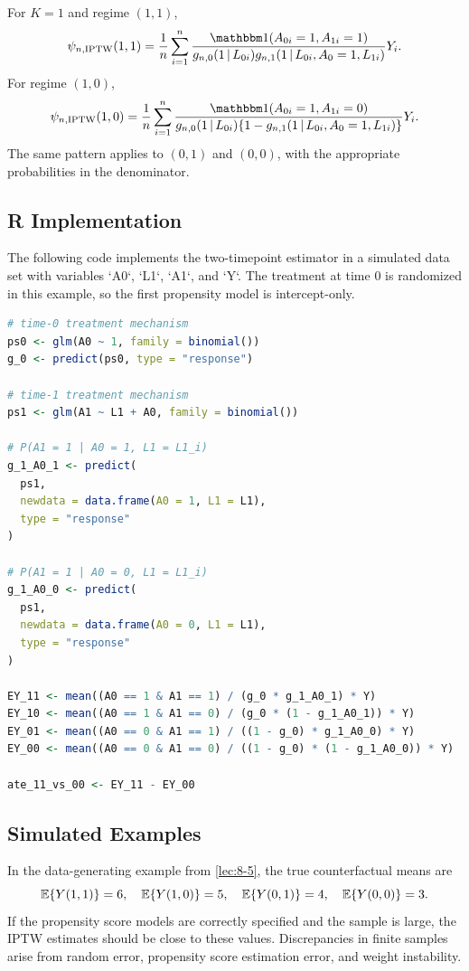 For $K=1$ and regime $(1,1)$,
\[
  \psi_{n,\IPTW}(1,1)
  =
  \frac{1}{n}\sum_{i=1}^n
  \frac{\ind(A_{0i}=1,A_{1i}=1)}
       {g_{n,0}(1\given L_{0i})
        g_{n,1}(1\given L_{0i},A_0=1,L_{1i})}
  Y_i.
\]
For regime $(1,0)$,
\[
  \psi_{n,\IPTW}(1,0)
  =
  \frac{1}{n}\sum_{i=1}^n
  \frac{\ind(A_{0i}=1,A_{1i}=0)}
       {g_{n,0}(1\given L_{0i})
        \{1-g_{n,1}(1\given L_{0i},A_0=1,L_{1i})\}}
  Y_i.
\]
The same pattern applies to $(0,1)$ and $(0,0)$, with the appropriate
probabilities in the denominator.

\subsection{R Implementation}

The following code implements the two-timepoint estimator in a simulated data
set with variables `A0`, `L1`, `A1`, and `Y`. The treatment at time 0 is
randomized in this example, so the first propensity model is intercept-only.

\begin{lstlisting}[language=R]
# time-0 treatment mechanism
ps0 <- glm(A0 ~ 1, family = binomial())
g_0 <- predict(ps0, type = "response")

# time-1 treatment mechanism
ps1 <- glm(A1 ~ L1 + A0, family = binomial())

# P(A1 = 1 | A0 = 1, L1 = L1_i)
g_1_A0_1 <- predict(
  ps1,
  newdata = data.frame(A0 = 1, L1 = L1),
  type = "response"
)

# P(A1 = 1 | A0 = 0, L1 = L1_i)
g_1_A0_0 <- predict(
  ps1,
  newdata = data.frame(A0 = 0, L1 = L1),
  type = "response"
)

EY_11 <- mean((A0 == 1 & A1 == 1) / (g_0 * g_1_A0_1) * Y)
EY_10 <- mean((A0 == 1 & A1 == 0) / (g_0 * (1 - g_1_A0_1)) * Y)
EY_01 <- mean((A0 == 0 & A1 == 1) / ((1 - g_0) * g_1_A0_0) * Y)
EY_00 <- mean((A0 == 0 & A1 == 0) / ((1 - g_0) * (1 - g_1_A0_0)) * Y)

ate_11_vs_00 <- EY_11 - EY_00
\end{lstlisting}

\subsection{Simulated Examples}

In the data-generating example from \cref{lec:8-5}, the true counterfactual means
are
\[
  \mathbb{E}\{Y(1,1)\}=6,\quad
  \mathbb{E}\{Y(1,0)\}=5,\quad
  \mathbb{E}\{Y(0,1)\}=4,\quad
  \mathbb{E}\{Y(0,0)\}=3.
\]
If the propensity score models are correctly specified and the sample is large,
the IPTW estimates should be close to these values. Discrepancies in finite
samples arise from random error, propensity score estimation error, and weight
instability.

